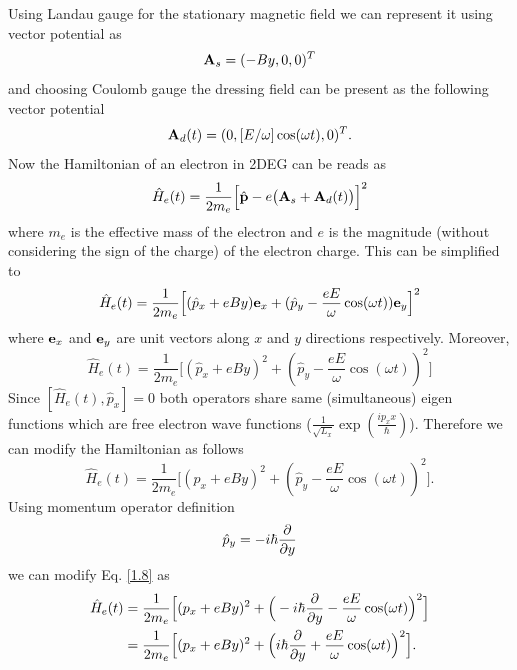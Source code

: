 \noindent
Using Landau gauge for the stationary magnetic field we can represent it using vector potential as
\begin{equation} \label{1.3}
  \vb{A}_{s} = (-By,0,0)^T
\end{equation}
and choosing Coulomb gauge the dressing field can be present as the following vector potential
\begin{equation} \label{1.4}
  \vb{A}_{d}(t) = (0,[E/\omega ]\cos(\omega t),0)^T.
\end{equation}
Now the Hamiltonian of an electron in 2DEG can be reads as
\begin{equation} \label{1.5}
  \hat{H}_e(t) = \frac{1}{2m_e}\Big[\hat{\vb{p}} - e\big(\vb{A}_{s}+\vb{A}_{d}(t)\big)\Big]^2
\end{equation}
where $m_e$ is the effective mass of the electron and $e$ is the magnitude (without considering the sign of the charge) of the electron charge. This can be simplified to
\begin{equation} \label{1.6}
  \hat{H}_e(t) = \frac{1}{2m_e}\Big[
    (\hat{p}_x + eBy)\vb{e}_x +
    (\hat{p}_y - \frac{eE}{\omega}\cos(\omega t))\vb{e}_y
  \Big]^2
\end{equation}
where $\vb{e}_x$ and $\vb{e}_y$ are unit vectors along $x$ and $y$ directions respectively. Moreover,
\begin{equation} \label{1.7}
  \hat{H}_e(t) = \frac{1}{2m_e}\Big[
    (\hat{p}_x + eBy)^2 +
    (\hat{p}_y - \frac{eE}{\omega}\cos(\omega t))^2
  \Big]
\end{equation}
Since $[\hat{H}_e(t),\hat{p}_x] =0$ both operators share same (simultaneous) eigen functions which are free electron wave functions
($\frac{1}{\sqrt{L_x}}\exp(\frac{ip_x x}{\hbar})$).
Therefore we can modify the Hamiltonian as follows
\begin{equation} \label{1.8}
  \hat{H}_e(t) = \frac{1}{2m_e}\Big[
    ({p}_x + eBy)^2 +
    (\hat{p}_y - \frac{eE}{\omega}\cos(\omega t))^2
  \Big].
\end{equation}
Using momentum operator definition
\begin{equation} \label{1.9}
  \hat{p}_y = -i\hbar \pdv{y}
\end{equation}
we can modify Eq. \eqref{1.8} as
\begin{equation} \label{1.10}
  \begin{aligned}
    \hat{H}_e(t) & = \frac{1}{2m_e}\Big[
      ({p}_x + eBy)^2 +
      \Big(-i\hbar \pdv{y}- \frac{eE}{\omega}\cos(\omega t)\Big)^2
    \Big] \\
    & = \frac{1}{2m_e}\Big[
      ({p}_x + eBy)^2 +
      \Big(i\hbar \pdv{y} + \frac{eE}{\omega}\cos(\omega t)\Big)^2
    \Big].
  \end{aligned}
\end{equation}
